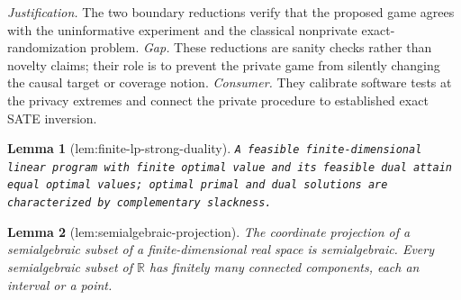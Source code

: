 \documentclass{article}
\newtheorem{lemma}{Lemma}
\begin{document}
\par\smallskip\noindent \textit{Justification.} The two boundary reductions verify that the proposed game agrees with the uninformative experiment and the classical nonprivate exact-randomization problem. \textit{Gap.} These reductions are sanity checks rather than novelty claims; their role is to prevent the private game from silently changing the causal target or coverage notion. \textit{Consumer.} They calibrate software tests at the privacy extremes and connect the private procedure to established exact SATE inversion.

\begin{lemma}[lem:finite-lp-strong-duality]\label{lem:finite-lp-strong-duality}
\texttt{A feasible finite-\allowbreak{}dimensional linear program with finite optimal value and its feasible dual attain equal optimal values;\allowbreak{} optimal primal and dual solutions are characterized by complementary slackness.}
\end{lemma}

\begin{lemma}[lem:semialgebraic-projection]\label{lem:semialgebraic-projection}
The coordinate projection of a semialgebraic subset of a finite-dimensional real space is semialgebraic.  Every semialgebraic subset of \(\mathbb R\) has finitely many connected components, each an interval or a point.
\end{lemma}
\end{document}
